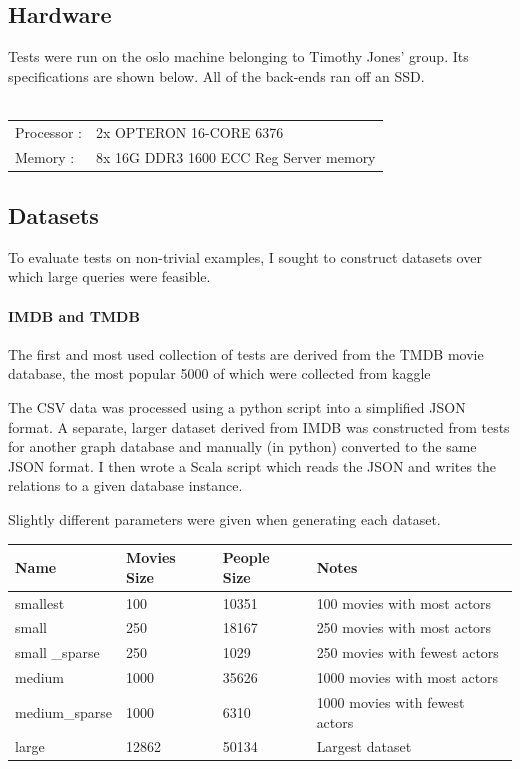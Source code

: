 \documentclass[12pt,a4paper,twoside,openright]{report}
\let\oldparagraph\paragraph
\renewcommand{\paragraph}[1]{\oldparagraph{#1}\mbox{}}
\begin{document}
	\subsection{Hardware}
	Tests were run on the oslo machine belonging to Timothy Jones' group. Its specifications are shown below. All of the back-ends ran off an SSD.
\\\\	\begin{tabular}{|p{5cm}p{10cm}|}
	\hline
		Processor : & 2x OPTERON 16-CORE 6376 \\
		Memory : & 8x 16G DDR3 1600 ECC Reg Server memory\\
	\hline
	\end{tabular}
	\subsection{Datasets}
	To evaluate tests on non-trivial examples, I sought to construct datasets over which large queries were feasible.

		\paragraph{IMDB and TMDB}
		The first and most used collection of tests are derived from the TMDB movie database, the most popular 5000 of which were collected from kaggle \cite{TMDB5000}

The CSV data was processed using a python script into a simplified JSON format. A separate, larger dataset derived from IMDB was constructed from tests for another graph database \cite{IMDB} and manually (in python) converted to the same JSON format. I then wrote a Scala script which reads the JSON and writes the relations to a given database instance.

Slightly different parameters were given when generating each dataset.

\begin{center}
	\begin{tabular}{ |p{3cm}||p{3cm}|p{3cm}||p{3cm}|  }	
	\hline
        Name & Movies Size & People Size & Notes \\ \hline
        smallest & 100 & 10351 & 100 movies with most actors \\ \hline
        small & 250 & 18167 & 250 movies with most actors \\ \hline
        small _sparse & 250 & 1029 & 250 movies with fewest actors \\ \hline
        medium & 1000 & 35626 & 1000 movies with most actors \\ \hline
        medium_sparse & 1000 & 6310 & 1000 movies with fewest actors \\ \hline 
       large & 12862 & 50134 & Largest dataset \\ \hline
	\end{tabular}
\end{center}
\end{document}
